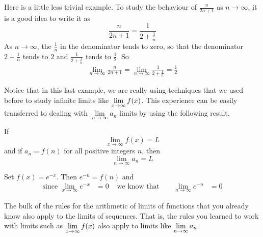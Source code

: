 \begin{eg}
                   \label{eg:SRsequenceLimB}
Here is a little less trivial example. To study the behaviour of $\frac{n}{2n+1}$ as $n\rightarrow\infty$, it is a good
idea to write it as
\begin{equation*}
\frac{n}{2n+1}=\frac{1}{2+\frac{1}{n}}
\end{equation*}
As $n\rightarrow\infty$, the $\frac{1}{n}$ in the denominator tends to
zero, so that the denominator $2+\frac{1}{n}$ tends to $2$ and
$\frac{1}{2+\frac{1}{n}}$ tends to $\frac{1}{2}$. So
\begin{align*}
\lim_{n\rightarrow\infty}\frac{n}{2n+1}
=\lim_{n\rightarrow\infty}\frac{1}{2+\frac{1}{n}}
=\frac{1}{2}
\end{align*}
\end{eg}
Notice that in this last example, we are really using techniques that
we used before to study infinite limits like
$\displaystyle \lim_{x\rightarrow\infty}f(x)$.
This experience can be easily transferred to dealing with
$\lim\limits_{n\rightarrow\infty}a_n$ limits by using the following result.
\begin{theorem}\label{thm:SRxlimtoanlim}
If
\begin{equation*}
\lim_{x\rightarrow\infty} f(x) = L
\end{equation*}
and if $a_n=f(n)$ for all positive integers $n$, then
\begin{equation*}
\lim_{n\rightarrow\infty} a_n = L
\end{equation*}
\end{theorem}

\goodbreak
\begin{eg}
                   \label{eg:SRsequenceLimC}
Set $f(x)=e^{-x}$. Then $e^{-n}=f(n)$ and
\begin{align*}
\text{since }
\lim_{x\rightarrow\infty}e^{-x}&=0
&\text{ we know that }&&
\lim\limits_{n\rightarrow\infty}e^{-n}&=0
\end{align*}
\end{eg}
The bulk of the rules for the arithmetic of limits of functions
that you already know also apply to the limits of sequences.
That is, the rules you learned to work with limits such as
$\displaystyle \lim_{x\rightarrow\infty}f(x)$
also apply to limits like  $\displaystyle\lim_{n\rightarrow\infty}a_n$.

